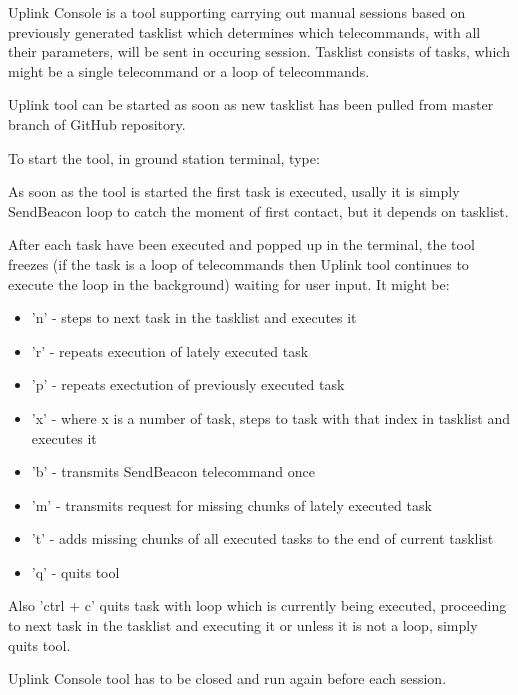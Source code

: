 Uplink Console is a tool supporting carrying out manual sessions based on previously generated tasklist which determines which telecommands, with all their parameters, will be sent in occuring session. Tasklist consists of tasks, which might be a single telecommand or a loop of telecommands.

Uplink tool can be started as soon as new tasklist has been pulled from master branch of GitHub repository.

To start the tool, in ground station terminal, type:\\
\begin{center}
\end{center}

As soon as the tool is started the first task is executed, usally it is simply SendBeacon loop to catch the moment of first contact, but it depends on tasklist.

After each task have been executed and popped up in the terminal, the tool freezes (if the task is a loop of telecommands then Uplink tool continues to execute the loop in the background) waiting for user input. It might be:
\begin{itemize}
\item 'n' - steps to next task in the tasklist and executes it
\item 'r' - repeats execution of lately executed task
\item 'p' - repeats exectution of previously executed task
\item 'x' - where x is a number of task, steps to task with that index in tasklist and executes it
\item 'b' - transmits SendBeacon telecommand once
\item 'm' - transmits request for missing chunks of lately executed task
\item 't' - adds missing chunks of all executed tasks to the end of current tasklist
\item 'q' - quits tool
\end{itemize}
Also 'ctrl + c' quits task with loop which is currently being executed, proceeding to next task in the tasklist and executing it or unless it is not a loop, simply quits tool.

Uplink Console tool has to be closed and run again before each session.